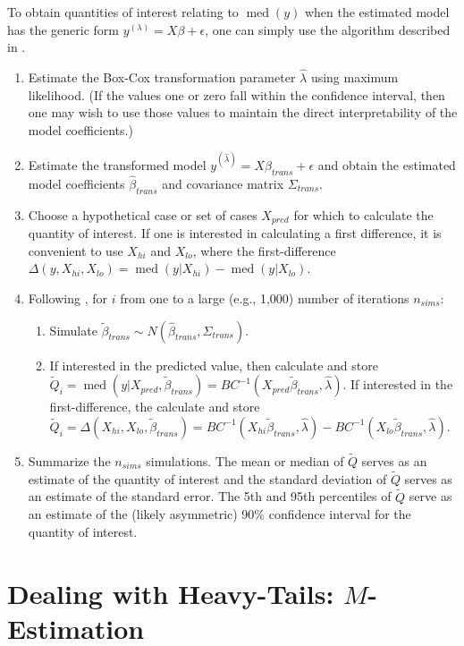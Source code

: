 \documentclass[12pt]{article}
\DeclareMathOperator{\med}{med}
\begin{document}
To obtain quantities of interest relating to $\med(y)$ when the estimated model has the generic form $y^{(\lambda)} = X\beta + \epsilon$, one can simply use the algorithm described in \cite{KingTomzWittenberg2000}.
\begin{enumerate}
\item Estimate the Box-Cox transformation parameter $\hat{\lambda}$ using maximum likelihood. 
(If the values one or zero fall within the confidence interval, then one may wish to use those values to maintain the direct interpretability of the model coefficients.)
\item Estimate the transformed model $y^{(\hat{\lambda})} = X\beta_{trans} + \epsilon$ and obtain the estimated model coefficients $\hat{\beta}_{trans}$ and covariance matrix $\Sigma_{trans}$.
\item Choose a hypothetical case or set of cases $X_{pred}$ for which to calculate the quantity of interest. 
If one is interested in calculating a first difference, it is convenient to use $X_{hi}$ and $X_{lo}$, where the first-difference $\Delta(y, X_{hi}, X_{lo}) = \med(y | X_{hi}) - \med(y | X_{lo})$.
\item Following \cite{KingTomzWittenberg2000}, for $i$ from one to a large (e.g., 1,000) number of iterations $n_{sims}$:
        \begin{enumerate}
        \item Simulate $\tilde{\beta}_{trans} \sim N\left(\hat{\beta}_{trans}, \Sigma_{trans}\right)$.
        \item If interested in the predicted value, then calculate and store $\tilde{Q}_i = \med(y | X_{pred}, \tilde{\beta}_{trans}) = BC^{-1}(X_{pred}\tilde{\beta}_{trans}, \hat{\lambda})$. If interested in the first-difference, the calculate and store $\tilde{Q}_i = \Delta(X_{hi}, X_{lo}, \tilde{\beta}_{trans}) = BC^{-1}(X_{hi}\tilde{\beta}_{trans}, \hat{\lambda}) - BC^{-1}(X_{lo}\tilde{\beta}_{trans}, \hat{\lambda})$.
        \end{enumerate}
\item Summarize the $n_{sims}$ simulations. 
The mean or median of $\tilde{Q}$ serves as an estimate of the quantity of interest and the standard deviation of $\tilde{Q}$ serves as an estimate of the standard error. The 5th and 95th percentiles of $\tilde{Q}$ serve as an estimate of the (likely asymmetric) 90\% confidence interval for the quantity of interest.
\end{enumerate}

\section*{Dealing with Heavy-Tails: $M$-Estimation}
\end{document}

